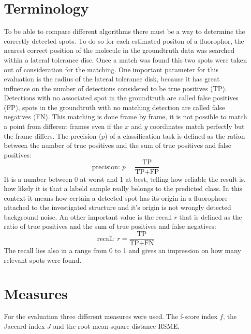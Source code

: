\section{Terminology}
To be able to compare different algorithms there must be a way to determine the correctly detected spots. To do so for each estimated positon of a fluorophor, the nearest correct position of the molecule in the groundtruth data was searched within a lateral tolerance disc. Once a match was found this two spots were taken out of consideration for the matching.\newline
One important parameter for this evaluation is the radius of the lateral tolerance disk, because it has great influence on the number of detections considered to be true positives (TP).\newline
Detections with no associated spot in the groundtruth are called false positives (FP), spots in the groundtruth with no matching detection are called false negatives (FN).\newline
This matching is done frame by frame, it is not possible to match a point from different frames even if the $x$ and $y$ coordinates match perfectly but the frame differs.\newline
The precision ($p$) of a classification task is defined as the ration between the number of true positives and the sum of true positives and false positives:
\begin{equation}
\text{precision: }p = \frac{\text{TP}}{\text{TP}+\text{FP}} 
\end{equation}
It is a number between 0 at worst and 1 at best, telling how reliable the result is, how likely it is that a labeld sample really belongs to the predicted class. In this context it means how certain a detected spot has its origin in a fluorophore attached to the investigated structure and it's origin is not wrongly detected background noise.\newline
An other important value is the recall $r$ that is defined as the ratio of true positives and the sum of true positives and false negatives:
\begin{equation}
\text{recall: }r = \frac{\text{TP}}{\text{TP}+\text{FN}}
\end{equation}
The recall lies also in a range from 0 to 1  and gives an impression on how many relevant spots were found.

\section{Measures} \label{measuresISBI}
For the evaluation three different measures were used. The f-score index $f$, the Jaccard index $J$ and the root-mean square distance RSME. 
